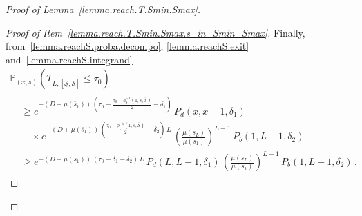 \documentclass[10pt]{amsart}
\theoremstyle{definition}\newtheorem{defi}[theo]{Definition}\newtheorem{rema}[theo]{Remark}\newtheorem{exam}[theo]{Example}\newtheorem{exem}[theo]{Example}\newtheorem{nota}[theo]{Notation}
\newcommand{\PP}{\mathbb{P}}
\newcommand{\Smin}{\underline{\mathcal{S}}}
\newcommand{\Smax}{\bar{\mathcal{S}}}
\newcommand{\barmu}{\mu(\bar s_1)}
\newcommand{\phit}{\phi_\textsf{t}^{-1}}
\newcommand{\1}{\mathbf{1}}
\begin{document}
\begin{proof}[Proof of Lemma~\ref{lemma.reach.T.Smin.Smax}]
\begin{proof}[{Proof of Item~\eqref{lemma.reach.T.Smin.Smax.s_in_Smin_Smax}}]
Finally, from~\eqref{lemma.reachS.proba.decompo}, \eqref{lemma.reachS.exit} and~\eqref{lemma.reachS.integrand}
\begin{multline*}
\PP_{(x,s)}\left(T_{L,[\Smin,\Smax]}\leq \tau_0\right)\\
\begin{aligned}
 & \geq e^{-(D+\barmu)\,\left(\tau_0-\frac{\tau_0-\phit\left(1, s,\Smax\right)}{2}-\delta_1\right)}\, P_d(x,x-1, \delta_1)
\\
& \quad \times e^{-(D+\barmu)\,\left(\frac{\tau_0-\phit\left(1, s,\Smax\right)}{2}-\delta_2\right)\,L}\,
\left(\frac{\mu(\bar s_L)}{\barmu}\right)^{L-1}\,P_b(1,L-1, \delta_2)
\\
& \geq e^{-(D+\barmu)\,\left(\tau_0-\delta_1-\delta_2\right)\,L}\, P_d(L,L-1, \delta_1)\,
\left(\frac{\mu(\bar s_L)}{\barmu}\right)^{L-1}\,P_b(1,L-1, \delta_2)\,.
\end{aligned}
\end{multline*}




\end{proof}
\end{proof}
\end{document}
